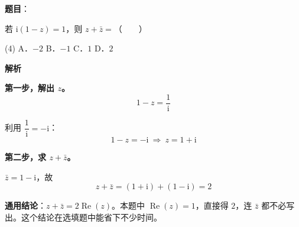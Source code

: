 \begin{answer}

\textbf{题目}：

若 $\mathrm i(1-z)=1$，则 $z+\bar z=$\mbox{（　　）}

\begin{gkopts}(4)
\task A．$-2$
\task B．$-1$
\task C．$1$
\task D．$2$
\end{gkopts}

\textbf{解析}

\textbf{第一步，解出 $z$。}
\nopagebreak[4]
\[1-z=\frac1{\mathrm i}\]

利用 $\dfrac1{\mathrm i}=-\mathrm i$：
\nopagebreak[4]
\[1-z=-\mathrm i\ \Longrightarrow\ z=1+\mathrm i\]

\textbf{第二步，求 $z+\bar z$。}

$\bar z=1-\mathrm i$，故
\nopagebreak[4]
\[z+\bar z=(1+\mathrm i)+(1-\mathrm i)=2\]

\begin{gktip}
\textbf{通用结论}：$z+\bar z=2\operatorname{Re}(z)$。本题中 $\operatorname{Re}(z)=1$，直接得 $2$，连 $\bar z$ 都不必写出。这个结论在选填题中能省下不少时间。
\end{gktip}


\par\medskip

\end{answer}
